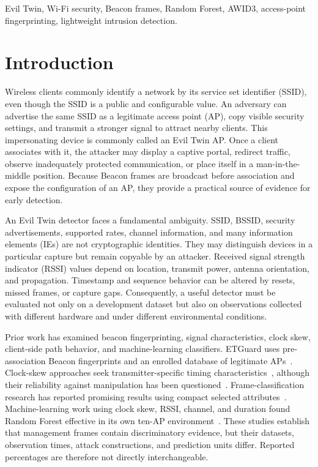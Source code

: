 \documentclass[conference]{IEEEtran}
\begin{document}
\begin{IEEEkeywords}
Evil Twin, Wi-Fi security, Beacon frames, Random Forest, AWID3, access-point fingerprinting, lightweight intrusion detection.
\end{IEEEkeywords}

\section{Introduction}

Wireless clients commonly identify a network by its service set identifier (SSID), even though the SSID is a public and configurable value. An adversary can advertise the same SSID as a legitimate access point (AP), copy visible security settings, and transmit a stronger signal to attract nearby clients. This impersonating device is commonly called an Evil Twin AP. Once a client associates with it, the attacker may display a captive portal, redirect traffic, observe inadequately protected communication, or place itself in a man-in-the-middle position. Because Beacon frames are broadcast before association and expose the configuration of an AP, they provide a practical source of evidence for early detection.

An Evil Twin detector faces a fundamental ambiguity. SSID, BSSID, security advertisements, supported rates, channel information, and many information elements (IEs) are not cryptographic identities. They may distinguish devices in a particular capture but remain copyable by an attacker. Received signal strength indicator (RSSI) values depend on location, transmit power, antenna orientation, and propagation. Timestamp and sequence behavior can be altered by resets, missed frames, or capture gaps. Consequently, a useful detector must be evaluated not only on a development dataset but also on observations collected with different hardware and under different environmental conditions.

Prior work has examined beacon fingerprinting, signal characteristics, clock skew, client-side path behavior, and machine-learning classifiers. ETGuard uses pre-association Beacon fingerprints and an enrolled database of legitimate APs~\cite{jain2019etguard}. Clock-skew approaches seek transmitter-specific timing characteristics~\cite{jana2010clock}, although their reliability against manipulation has been questioned~\cite{arackaparambil2010reliability}. Frame-classification research has reported promising results using compact selected attributes~\cite{asaduzzaman2020frames}. Machine-learning work using clock skew, RSSI, channel, and duration found Random Forest effective in its own ten-AP environment~\cite{seo2020reliability}. These studies establish that management frames contain discriminatory evidence, but their datasets, observation times, attack constructions, and prediction units differ. Reported percentages are therefore not directly interchangeable.
\end{document}
